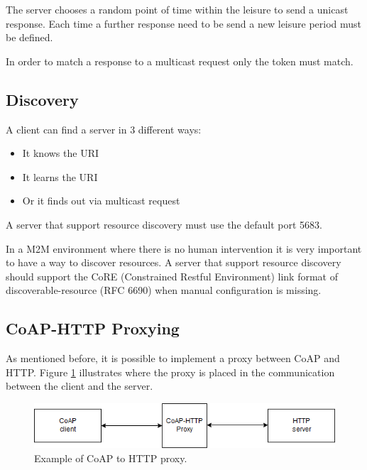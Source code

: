 	The server chooses a random point of time within the leisure to send a unicast response.\newline
	Each time a further response need to be send a new leisure period must be defined.\newline
	
	In order to match a response to a multicast request only the token must match.\newline
	
	\subsection{Discovery}
	A client can find a server in 3 different ways:
	\begin{itemize}
		\item It knows the URI
		\item It learns the URI
		\item Or it finds out via multicast request
	\end{itemize}

	A server that support resource discovery must use the default port 5683.\newline
	
	In a M2M environment where there is no human intervention it is very important to have a way to discover resources.\newline
	A server that support resource discovery should support the CoRE (Constrained Restful Environment) link format of discoverable-resource (RFC 6690) when manual configuration is missing.\newline
	
	\subsection{CoAP-HTTP Proxying}
	As mentioned before, it is possible to implement a proxy between CoAP and HTTP.\newline
	Figure \ref{fig:coap2} illustrates where the proxy is placed in the communication between the client and the server.
	
	\begin{figure}
		\includegraphics[width=\linewidth]{coap-img1.png}
		\caption{Example of CoAP to HTTP proxy.}
		\label{fig:coap2}
	\end{figure}
	
